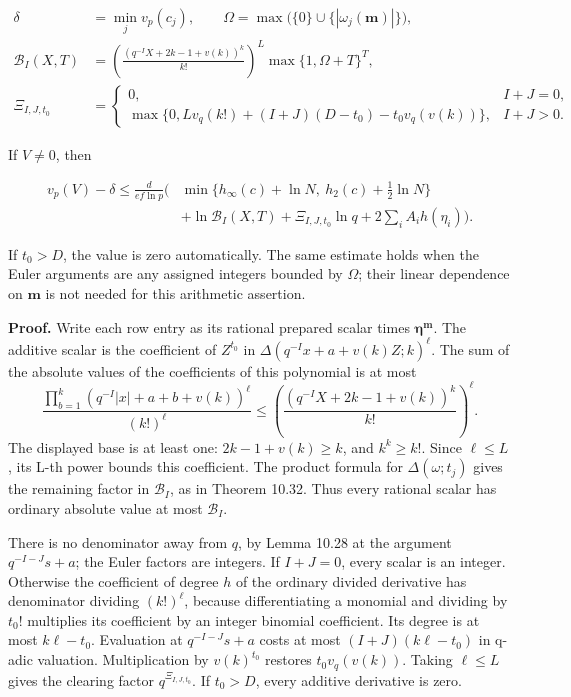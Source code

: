 \documentclass[
  11pt,
  a4paper,
]{article}
\begin{document}
\[
\begin{aligned}
\delta&=\min_jv_p(c_j),\qquad
\Omega=\max\bigl(\{0\}\cup\{|\omega_j(\boldsymbol m)|\}\bigr),\\
\mathcal B_I(X,T)&=
\left(\frac{(q^{-I}X+2k-1+v(k))^k}{k!}\right)^L
\max\{1,\Omega+T\}^{T},\\
\Xi_{I,J,t_0}&=
\begin{cases}
0,&I+J=0,\\
\max\{0,Lv_q(k!)+(I+J)(D-t_0)-t_0v_q(v(k))\},&I+J>0.
\end{cases}
\end{aligned}
\tag{10.115}
\]

If \(V\ne0\), then

\[
\begin{aligned}
v_p(V)-\delta\le\frac d{ef\ln p}
\biggl(&\min\{h_\infty(c)+\ln N,\ h_2(c)+\tfrac12\ln N\}\\
&+\ln\mathcal B_I(X,T)+\Xi_{I,J,t_0}\ln q
+2\sum_iA_i h(\eta_i)\biggr).
\end{aligned}
\tag{10.116}
\]

If \(t_0>D\), the value is zero automatically. The same estimate holds
when the Euler arguments are any assigned integers bounded by
\(\Omega\); their linear dependence on \(\boldsymbol m\) is not needed
for this arithmetic assertion.

\textbf{Proof.} Write each row entry as its rational prepared scalar
times \(\boldsymbol\eta^{\boldsymbol m}\). The additive scalar is the
coefficient of \(Z^{t_0}\) in \(\Delta(q^{-I}x+a+v(k)Z;k)^\ell\). The
sum of the absolute values of the coefficients of this polynomial is at
most \[
\frac{\prod_{b=1}^k(q^{-I}|x|+a+b+v(k))^\ell}{(k!)^\ell}
\le\left(\frac{(q^{-I}X+2k-1+v(k))^k}{k!}\right)^\ell.
\] The displayed base is at least one: \(2k-1+v(k)\ge k\), and
\(k^k\ge k!\). Since \(\ell\le L\), its L-th power bounds this
coefficient. The product formula for \(\Delta(\omega;t_j)\) gives the
remaining factor in \(\mathcal B_I\), as in Theorem 10.32. Thus every
rational scalar has ordinary absolute value at most \(\mathcal B_I\).

There is no denominator away from \(q\), by Lemma 10.28 at the argument
\(q^{-I-J}s+a\); the Euler factors are integers. If \(I+J=0\), every
scalar is an integer. Otherwise the coefficient of degree \(h\) of the
ordinary divided derivative has denominator dividing \((k!)^\ell\),
because differentiating a monomial and dividing by \(t_0!\) multiplies
its coefficient by an integer binomial coefficient. Its degree is at
most \(k\ell-t_0\). Evaluation at \(q^{-I-J}s+a\) costs at most
\((I+J)(k\ell-t_0)\) in q-adic valuation. Multiplication by
\(v(k)^{t_0}\) restores \(t_0v_q(v(k))\). Taking \(\ell\le L\) gives the
clearing factor \(q^{\Xi_{I,J,t_0}}\). If \(t_0>D\), every additive
derivative is zero.
\end{document}
